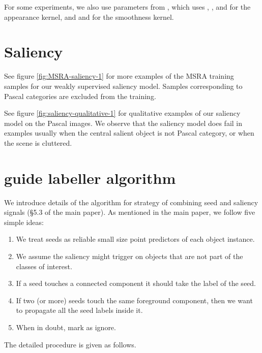 \documentclass[british,10pt,twocolumn,letterpaper]{article}
\begin{document}
For some experiments, we also use parameters from \cite{kolesnikov2016seed},
which uses , , and 
for the appearance kernel, and  and 
for the smoothness kernel.

\section{\label{sec:supp-saliency}Saliency}

See figure \ref{fig:MSRA-saliency-1} for more examples of the MSRA
training samples for our weakly supervised saliency model. Samples
corresponding to Pascal categories are excluded from the training.

See figure \ref{fig:saliency-qualitative-1} for qualitative examples
of our saliency model on the Pascal images. We observe that the saliency
model does fail in examples usually when the central salient object
is not Pascal category, or when the scene is cluttered.

\section{\label{sec:supp-alg} guide labeller algorithm}

We introduce details of the algorithm for  strategy
of combining seed and saliency signals (\S5.3 of the main paper).
As mentioned in the main paper, we follow five simple ideas:
\begin{enumerate}
\item We treat seeds as reliable small size point predictors of each object
instance.
\item We assume the saliency might trigger on objects that are not part
of the classes of interest.
\item If a seed touches a connected component it should take
the label of the seed.
\item If two (or more) seeds touch the same foreground component, then we
want to propagate all the seed labels inside it.
\item When in doubt, mark as ignore.
\end{enumerate}
The detailed procedure is given as follows.
\end{document}
